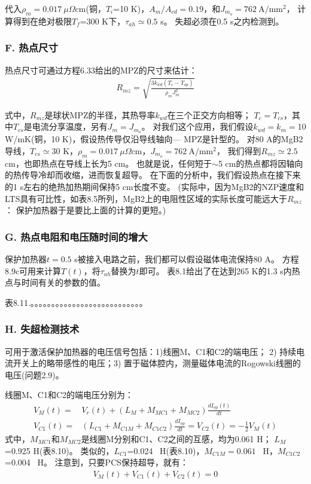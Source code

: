 代入$\rho_m=0.017\ \mu\Omega$cm(铜，$T_i$=10 K)，$A_m/A_{cd}=0.19$，和$J_{m_o}=762\ \mathrm{A/mm^2}$，
计算得到在绝对极限$T_f$=300 K下，$\tau_{ah}\simeq 0.5$ s。
失超必须在0.5 s之内检测到。

\subsubsection*{F. 热点尺寸}
热点尺寸可通过方程6.33给出的MPZ的尺寸来估计：
\begin{align*}%
R_{mz}=\sqrt{\frac{3k_{wd}(T_c-T_{op})}{\rho_mJ_{m}^{2}}} \tag{6.33}
\end{align*}

式中，$R_{mz}$是球状MPZ的半径，其热导率$k_{wd}$在三个正交方向相等；
$T_c=T_{cs}$，其中$T_{cs}$是电流分享温度，另有$J_m=J_{m_o}$。
对我们这个应用，我们假设$k_{wd}=k_m=$10 W/mK(铜，10 K)，假设热传导仅沿导线轴向---
MPZ是针型的。
对80 A的MgB2导线，$T_{cs}\simeq$30 K，$\rho_m=0.017\ \mu\Omega$cm，$J_{m_o}=762\ \mathrm{A/mm^2}$，
我们得到$R_{mz}\simeq 2.5$ cm，也即热点在导线上长为5 cm。
也就是说，任何短于$\sim$5 cm的热点都将因轴向的热传导冷却而收缩，进而恢复超导。
在下面的分析中，我们假设热点在接下来的1 s左右的绝热加热期间保持5 cm长度不变。
(实际中，因为MgB2的NZP速度和LTS具有可比性，如表8.5所列，MgB2上的电阻性区域的实际长度可能远大于$R_{mz}$：
保护加热器于是要比上面的计算的更短。)


\subsubsection*{G. 热点电阻和电压随时间的增大}
保护加热器$t=0.5$ s被接入电路之前，我们都可以假设磁体电流保持80 A。
方程8.9c可用来计算$T(t)$，将$\tau_{ah}$替换为$t$即可。
表8.1给出了在达到265 K的1.3 s内热点与时间有关的参数的值。

表8.11.。。。。。。。。。。。。。。。。。。。。。。。。。。。

\subsubsection*{H. 失超检测技术}
可用于激活保护加热器的电压信号包括：1)线圈M、C1和C2的端电压；
2) 持续电流开关上的略带感性的电压；3) 置于磁体腔内，测量磁体电流的Rogowski线圈的电压(问题2.9)。

线圈M、C1和C2的端电压分别为：
\begin{subequations}
	\begin{align}
V_M(t)=&V_r(t)+(L_M+M_{MC1}+M_{MC2})\frac{dI_{op}(t)}{dt}\\
V_{C1}(t)=&(L_{C1}+M_{C1M}+M_{C1C2})\frac{dI_{op}}{dt}=V_{C2}(t)=-\frac{1}{2}V_M(t)
	\end{align}
\end{subequations}
式中，$M_{MC1}$和$M_{MC2}$是线圈M分别和C1、C2之间的互感，均为0.061 H；
$L_M$=0.925 H(表8.10)。
类似的，$L_{C1}$=0.024~ H(表8.10)，$M_{C1M}=0.061$~ H，$M_{C1C2}$=0.004~ H。
注意到，只要PCS保持超导，就有：
\begin{align*}%
V_M(t)+V_{C1}(t)+V_{C2}(t)=0 \tag{8.82c}
\end{align*}


